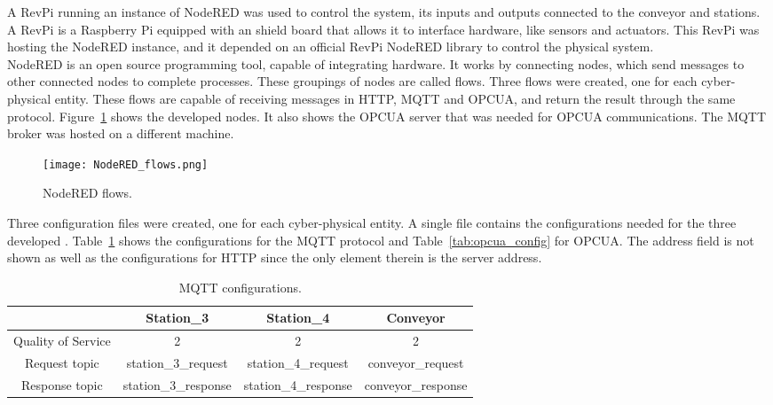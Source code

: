 A RevPi running an instance of NodeRED was used to control the system, its inputs and outputs connected to the conveyor and stations. A RevPi is a Raspberry Pi equipped with an shield board that allows it to interface hardware, like sensors and actuators. This RevPi was hosting the NodeRED instance, and it depended on an official RevPi NodeRED library to control the physical system.\\

NodeRED is an open source programming tool, capable of integrating hardware. It works by connecting nodes, which send messages to other connected nodes to complete processes. These groupings of nodes are called flows. Three flows were created, one for each cyber-physical entity. These flows are capable of receiving messages in \acrshort{HTTP}, \acrshort{MQTT} and \acrshort{OPCUA}, and return the result through the same protocol. Figure~\ref{fig:nodered_flows} shows the developed nodes. It also shows the \acrshort{OPCUA} server that was needed for \acrshort{OPCUA} communications. The \acrshort{MQTT} broker was hosted on a different machine.\\

\begin{figure}[h!]
	\centering
	\texttt{[image: NodeRED\_flows.png]}
	\caption{NodeRED flows.}
	\label{fig:nodered_flows}
\end{figure}

Three configuration files were created, one for each cyber-physical entity. A single file contains the configurations needed for the three developed . Table~\ref{tab:mqtt_config} shows the configurations for the \acrshort{MQTT} protocol and Table~\ref{tab:opcua_config} for \acrshort{OPCUA}. The address field is not shown as well as the configurations for \acrshort{HTTP} since the only element therein is the server address.

\begin{table}[h!]
	\centering
	\caption{\acrshort{MQTT} configurations.}
	\begin{tabular}{c|c|c|c|}
		\cline{2-4}
		& Station\_3                 & Station\_4                 & Conveyor                   \\ \hline
		\multicolumn{1}{|c|}{Quality of Service} & 2                 		& 2                          & 2                          \\ \hline
		\multicolumn{1}{|c|}{Request topic}      & station\_3\_request        & station\_4\_request        & conveyor\_request          \\ \hline
		\multicolumn{1}{|c|}{Response topic}     & station\_3\_response       & station\_4\_response       & conveyor\_response         \\ \hline
	\end{tabular}
	\label{tab:mqtt_config}
\end{table}

